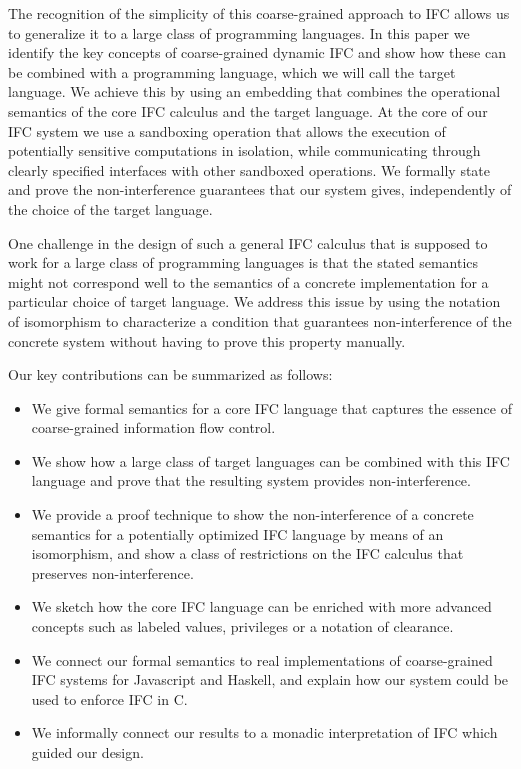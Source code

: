 The recognition of the simplicity of this coarse-grained approach
to IFC allows us to generalize it to a large class of programming
languages.  In this paper we identify the key concepts of coarse-grained
dynamic IFC and show how these can be combined with a programming
language, which we will call the target language.  We achieve this
by using an embedding that combines the operational semantics
of the core IFC calculus and the target language.
At the core of our IFC system we use a sandboxing operation that allows
the execution of potentially sensitive computations in isolation,
while communicating through clearly specified interfaces with other
sandboxed operations.
We formally state and prove the non-interference guarantees that our
system gives, independently of the choice of the target language.

One challenge in the design of such a general IFC calculus that
is supposed to work for a large class of programming languages is
that the stated semantics might not correspond well to the
semantics of a concrete implementation for a particular choice
of target language.  We address this issue by using the notation
of isomorphism to characterize a condition that guarantees
non-interference of the concrete system without having to prove
this property manually.

Our key contributions can be summarized as follows:
\begin{itemize}
  \item We give formal semantics for a core IFC language that
  captures the essence of coarse-grained information flow control.
  \item We show how a large class of target languages can be combined
  with this IFC language and prove that the resulting system provides
  non-interference.
  \item We provide a proof technique to show the non-interference
  of a concrete semantics for a potentially optimized IFC language
  by means of an isomorphism, and show a class of restrictions on
  the IFC calculus that preserves non-interference.
  \item We sketch how the core IFC language can be enriched with
  more advanced concepts such as labeled values, privileges or a
  notation of clearance.
  \item We connect our formal semantics to real implementations of
  coarse-grained IFC systems for Javascript and Haskell, and explain
  how our system could be used to enforce IFC in C.
  \item We informally connect our results to a monadic interpretation
  of IFC which guided our design.
\end{itemize}


